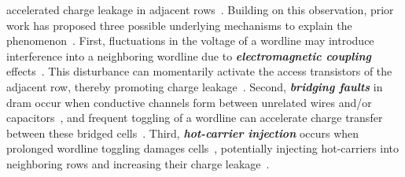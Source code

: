     accelerated charge leakage in adjacent rows~\cite{thesisDRAMA}. Building on this observation, 
    prior work has proposed three possible underlying mechanisms to explain the 
    phenomenon~\cite{paperFlippingBits, paperRHinDRAM, paperRHARetrospective}.
    First, fluctuations in the voltage of a wordline may introduce interference into 
    a neighboring wordline due to \textit{\textbf{electromagnetic coupling}}
    effects~\cite{paperCrosstalkNoise, paperCouplingNoise, paperFaultModels}. 
    This disturbance can momentarily activate the access transistors of the adjacent 
    row, thereby promoting charge leakage~\cite{paperFlippingBits}. Second, \textit{\textbf{bridging faults}} in \gls{dram} 
    occur when conductive channels form between unrelated wires and/or 
    capacitors~\cite{paperFaultAnalysis, paperDRAMSpecificSpace}, and frequent 
    toggling of a wordline can accelerate charge transfer between these bridged 
    cells~\cite{paperFlippingBits, paperRHinDRAM}. Third, \textit{\textbf{hot-carrier injection}} occurs when prolonged wordline 
    toggling damages cells~\cite{paperDRAMHCI}, potentially injecting 
    hot-carriers into neighboring rows and increasing their charge 
    leakage~\cite{paperFlippingBits, paperRHinDRAM}.
    
